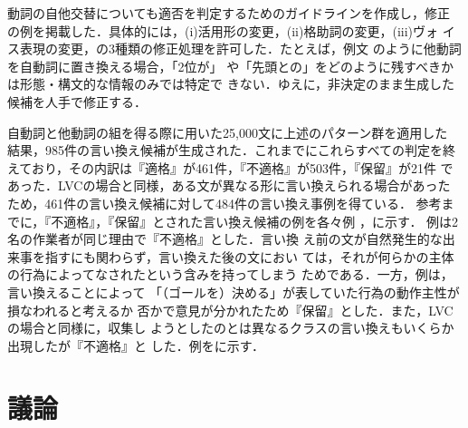 動詞の自他交替についても適否を判定するためのガイドラインを作成し，修正
の例を掲載した．具体的には，(i)活用形の変更，(ii)格助詞の変更，(iii)ヴォ
イス表現の変更，の3種類の修正処理を許可した．たとえば，例文
のように他動詞を自動詞に置き換える場合，「2位が」
や「先頭との」をどのように残すべきかは形態・構文的な情報のみでは特定で
きない．ゆえに，非決定のまま生成した候補を人手で修正する．


自動詞と他動詞の組を得る際に用いた25,000文に上述のパターン群を適用した
結果，985件の言い換え候補が生成された．これまでにこれらすべての判定を終
えており，その内訳は『適格』が461件，『不適格』が503件，『保留』が21件
であった．LVCの場合と同様，ある文が異なる形に言い換えられる場合があった
ため，461件の言い換え候補に対して484件の言い換え事例を得ている．
参考までに，『不適格』，『保留』とされた言い換え候補の例を各々例
，に示す．
例は2名の作業者が同じ理由で『不適格』とした．言い換
え前の文が自然発生的な出来事を指すにも関わらず，言い換えた後の文におい
ては，それが何らかの主体の行為によってなされたという含みを持ってしまう
ためである．一方，例は，言い換えることによって
「（ゴールを）決める」が表していた行為の動作主性が損なわれると考えるか
否かで意見が分かれたため『保留』とした．また，LVCの場合と同様に，収集し
ようとしたのとは異なるクラスの言い換えもいくらか出現したが『不適格』と
した．例をに示す．


\section{議論}
\label{sec:discussion}

